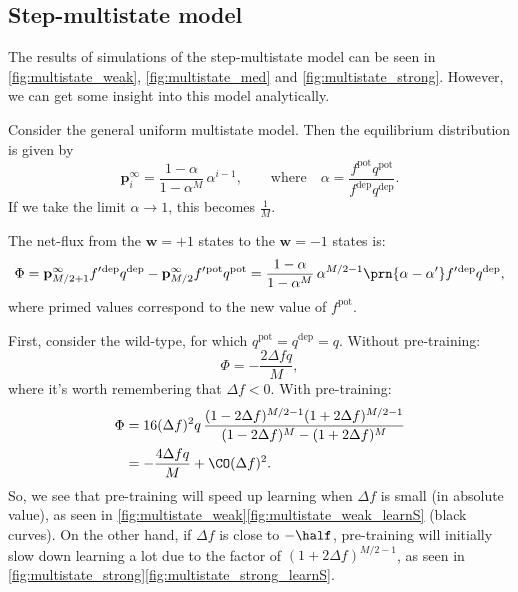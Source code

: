 \documentclass[12pt]{article}
\newcommand{\pr}{\mathbf{p}}
\newcommand{\eq}{\pr^\infty}
\newcommand{\w}{\mathbf{w}}
\newcommand{\pot}{^{\text{pot}}}
\newcommand{\dep}{^{\text{dep}}}
\begin{document}
\subsection{Step-multistate model}\label{sec:multistate}





The results of simulations of the step-multistate model can be seen in \autoref{fig:multistate_weak}, \autoref{fig:multistate_med} and \autoref{fig:multistate_strong}.
However, we can get some insight into this model analytically.



Consider the general uniform multistate model.
Then the equilibrium distribution is given by
%
\begin{equation}\label{eq:mutltieq}
  \eq_i = \frac{1-\alpha}{1-\alpha^M}\,\alpha^{i-1},
  \qquad \text{where} \quad
  \alpha=\frac{f\pot q\pot}{f\dep q\dep}.
\end{equation}
%
If we take the limit $\alpha\rightarrow1$, this becomes $\frac{1}{M}$.

The net-flux from the $\w=+1$ states to the $\w=-1$ states is:
%
\begin{equation}\label{eq:multiflux}
  \Phi = \eq_{M/2+1}f'{}\dep q\dep - \eq_{M/2}f'{}\pot q\pot = \frac{1-\alpha}{1-\alpha^M}\,\alpha^{M/2-1}\prn{\alpha-\alpha'}f'{}\dep q\dep,
\end{equation}
%
where primed values correspond to the new value of $f\pot$.

First, consider the wild-type, for which $q\pot=q\dep=q$.
Without pre-training:
%
\begin{equation}\label{eq:multiWTnopre}
  \Phi = -\frac{2\Delta fq}{M},
\end{equation}
%
where it's worth remembering that $\Delta f<0$.
With pre-training:
%
\begin{equation}\label{eq:multiWTpre}
\begin{aligned}
  \Phi &= 16(\Delta f)^2q \, \frac{(1-2\Delta f)^{M/2-1} (1+2\Delta f)^{M/2-1}}
          {(1-2\Delta f)^M - (1+2\Delta f)^M} \\
       &= -\frac{4\Delta fq}{M} + \CO(\Delta f)^2.
\end{aligned}
\end{equation}
%
So, we see that pre-training will speed up learning when $\Delta f$ is small (in absolute value), as seen in \autoref{fig:multistate_weak}\ref{fig:multistate_weak_learnS} (black curves).
On the other hand, if $\Delta f$ is close to $-\half$, pre-training will initially slow down learning a lot due to the factor of $(1+2\Delta f)^{M/2-1}$, as seen in \autoref{fig:multistate_strong}\ref{fig:multistate_strong_learnS}.
\end{document}
